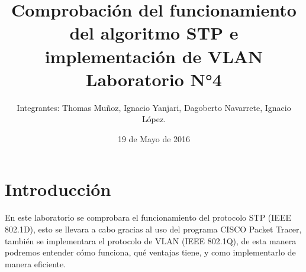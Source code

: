 \documentclass{udpreport}
\title{Comprobación del funcionamiento del algoritmo STP e implementación de VLAN Laboratorio N°4}
\author{Integrantes: Thomas Muñoz, Ignacio Yanjari, Dagoberto Navarrete, Ignacio López.}
\date{19 de Mayo de 2016}
\begin{document}
\maketitle
\tableofcontents
\listoffigures
\chapter{Introducción}
En este laboratorio se comprobara el funcionamiento del protocolo STP (IEEE 802.1D),  esto se llevara a cabo gracias al uso del programa CISCO Packet Tracer, también se implementara el protocolo de  VLAN (IEEE 802.1Q), de esta manera podremos entender cómo funciona, qué  ventajas tiene, y como implementarlo de manera eficiente.
\end{document}
